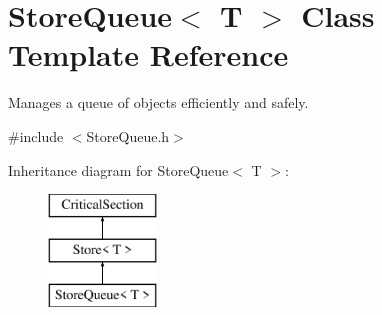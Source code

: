 \hypertarget{class_store_queue}{
\section{StoreQueue$<$ T $>$ Class Template Reference}
\label{class_store_queue}
}


Manages a queue of objects efficiently and safely.  




{\ttfamily \#include $<$StoreQueue.h$>$}

Inheritance diagram for StoreQueue$<$ T $>$:\begin{figure}[H]
\begin{center}
\leavevmode
\includegraphics[height=3.000000cm]{class_store_queue}
\end{center}
\end{figure}
